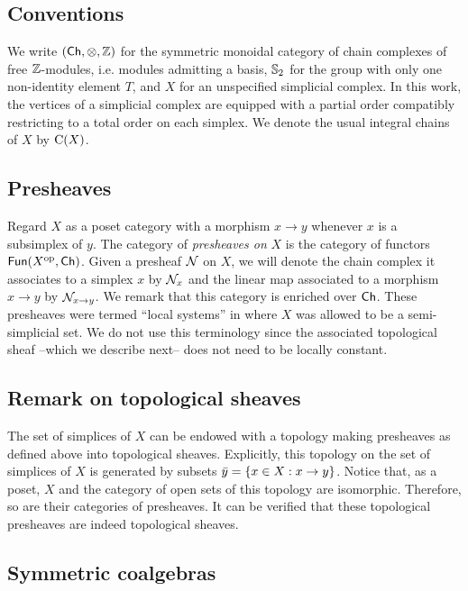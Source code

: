 
\subsection{Conventions}

We write $(\mathsf{Ch}, \otimes, \mathbb{Z})$ for the symmetric monoidal category of chain complexes of free $\mathbb{Z}$-modules, i.e. modules admitting a basis, $\mathbb{S}_2$ for the group with only one non-identity element $T$, and $X$ for an unspecified simplicial complex.
In this work, the vertices of a simplicial complex are equipped with a partial order compatibly restricting to a total order on each simplex.
We denote the usual integral chains of $X$ by $\operatorname{C}(X)$.

\subsection{Presheaves}\label{ss:presheaves}

Regard $X$ as a poset category with a morphism $x \to y$ whenever $x$ is a subsimplex of $y$.
The category of \textit{presheaves on} $X$ is the category of functors $\mathsf{Fun}(X^{\mathrm{op}}, \mathsf{Ch})$.
Given a presheaf $\mathcal{N}$ on $X$, we will denote the chain complex it associates to a simplex $x$ by $\mathcal{N}_x$ and the linear map associated to a morphism $x \to y$ by $\mathcal{N}_{x \to y}$.
We remark that this category is enriched over $\mathsf{Ch}$.
These presheaves were termed ``local systems'' in \cite{ranicki1990assembly} where $X$ was allowed to be a semi-simplicial set.
We do not use this terminology since the associated topological sheaf --which we describe next-- does not need to be locally constant.

\subsection{Remark on topological sheaves}\label{ss:topological sheaf}

The set of simplices of $X$ can be endowed with a topology making presheaves as defined above into topological sheaves.
Explicitly, this topology on the set of simplices of $X$ is generated by subsets $\bar y = \{x \in X : x \to y\}$.
Notice that, as a poset, $X$ and the category of open sets of this topology are isomorphic.
Therefore, so are their categories of presheaves.
It can be verified that these topological presheaves are indeed topological sheaves.

\subsection{Symmetric coalgebras}


